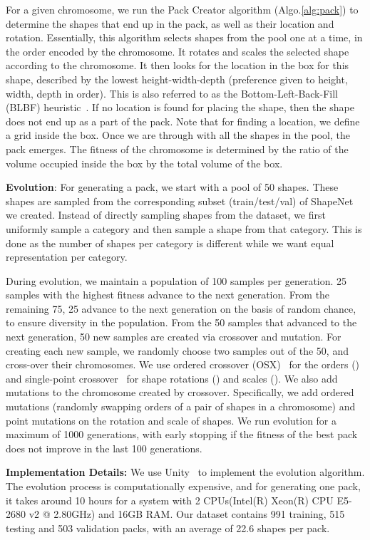 \documentclass{article}
\begin{document}
For a given chromosome, we run the Pack Creator algorithm (Algo.\ref{alg:pack}) to determine the shapes that end up in the pack, as well as their location and rotation. Essentially, this algorithm selects shapes from the pool one at a time, in the order encoded by the chromosome. It rotates and scales the selected shape according to the chromosome. It then looks for the location in the box for this shape, described by the lowest height-width-depth (preference given to height, width, depth in order). This is also referred to as the Bottom-Left-Back-Fill (BLBF) heuristic~\cite{tiwari2010fast}. If no location is found for placing the shape, then the shape does not end up as a part of the pack. Note that for finding a location, we define a  grid inside the box. Once we are through with all the shapes in the pool, the pack emerges. The fitness of the chromosome is determined by the ratio of the volume occupied inside the box by the total volume of the box. 

\noindent \textbf{Evolution}: For generating a pack, we start with a pool of 50 shapes. These shapes are sampled from the corresponding subset (train/test/val) of ShapeNet we created. Instead of directly sampling shapes from the dataset, we first uniformly sample a category and then sample a shape from that category. This is done as the number of shapes per category is different while we want equal representation per category.

During evolution, we maintain a population of 100 samples per generation. 25 samples with the highest fitness advance to the next generation. From the remaining 75, 25 advance to the next generation on the basis of random chance, to ensure diversity in the population. From the 50 samples that advanced to the next generation, 50 new samples are created via crossover and mutation. For creating each new sample, we randomly choose two samples out of the 50, and cross-over their chromosomes. We use ordered crossover 
(OSX)~\cite{davis1985applying} for the orders () and single-point 
crossover~\cite{holland1992adaptation} for shape rotations () and scales (). We also add mutations to the chromosome created by crossover. Specifically, we add ordered mutations (randomly swapping orders of a pair of shapes in a chromosome) and point mutations on the rotation and scale of shapes. We run evolution for a maximum of 1000 generations, with early stopping if the fitness of the best pack does not improve in the last 100 generations.

\noindent \textbf{Implementation Details: }We use Unity~\cite{goldstone2009unity} to implement the evolution algorithm. The evolution process is computationally expensive, and for generating one pack, it takes around 10 hours for a system with 2 CPUs(Intel(R) Xeon(R) CPU E5-2680 v2 @ 2.80GHz) and 16GB RAM. Our dataset contains 991 training, 515 testing and 503 validation packs, with an average of 22.6 shapes per pack.
\end{document}
